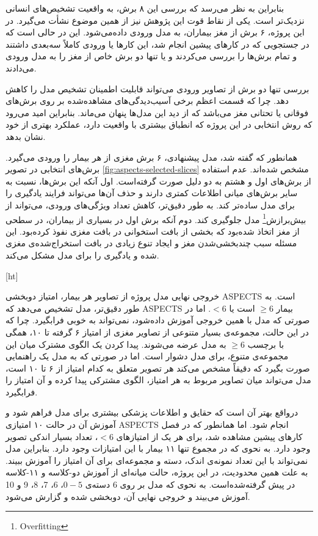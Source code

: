  بنابراین به نظر می‌رسد که بررسی این ۸ برش، به واقعیت تشخیص‌های انسانی نزدیک‌تر است.
 یکی از نقاط قوت این پژوهش نیز از همین موضوع نشأت می‌گیرد.
 در این پروژه، ۶ برش از مغز بیماران، به مدل ورودی داده‌می‌شود.
این در حالی است که در جستجویی که در کارهای پیشین
انجام شد، این کارها یا ورودی کاملاً سه‌بعدی داشتند و تمام برش‌ها را بررسی می‌کردند و یا تنها دو برش خاص از مغز را به مدل ورودی می‌دادند.

بررسی تنها دو برش از تصاویر ورودی می‌تواند قابلیت اطمینان تشخیص مدل را کاهش دهد.
چرا که قسمت اعظم برخی آسیب‌دیدگی‌های مشاهده‌شده
بر روی برش‌های فوقانی یا تحتانی مغز می‌باشد که از دید این مدل‌ها پنهان می‌ماند.
بنابراین امید می‌رود که روش انتخابی در این پروژه که انطباق بیشتری با واقعیت دارد، عملکرد بهتری از خود نشان بدهد.

همانطور که گفته شد، مدل پیشنهادی، ۶ برش مغزی از هر بیمار را ورودی می‌گیرد.
 برش‌های انتخابی در تصویر \ref{fig:aspects-selected-slices} مشخص شده‌اند.
 عدم استفاده از برش‌های اول و هشتم 
به دو دلیل صورت گرفته‌است.
اول آنکه این برش‌ها، نسبت به سایر برش‌های میانی اطلاعات کمتری دارند و حذف آن‌ها می‌تواند فرایند یادگیری را برای مدل ساده‌تر کند.
به طور دقیق‌تر، کاهش تعداد ویژگی‌های ورودی، می‌تواند از 
بیش‌برازش\footnote{Overfitting}
مدل جلوگیری کند.
دوم آنکه برش اول در بسیاری از بیماران، در سطحی از مغز اتخاذ شده‌بود که 
بخشی از بافت استخوانی در بافت مغزی نفوذ کرده‌بود.
این مسئله سبب چند‌بخشی‌شدن مغز و ایجاد تنوع زیادی در بافت استخراج‌شده‌ی مغزی شده و یادگیری را برای مدل مشکل می‌کند.

[ht]


خروجی نهایی مدل پروژه از تصاویر هر بیمار، امتیاز دوبخشی ASPECTS است.
به طور دقیق‌تر، مدل تشخیص می‌دهد که ASPECTS بیمار $\geq 6$ است یا $<6$.
اما در صورتی که مدل با همین خروجی آموزش داده‌شود،
نمی‌تواند به خوبی فرابگیرد.
چرا که در این حالت،
مجموعه‌ی بسیار متنوعی از تصاویر مغزی از
امتیاز ۶ گرفته تا ۱۰، همگی با برچسب
$\geq6$ به مدل عرضه می‌شوند.
پیدا کردن یک الگوی مشترک میان این مجموعه‌ی متنوع، برای مدل دشوار است.
اما در صورتی که به مدل یک راهنمایی صورت بگیرد که دقیقاً مشخص می‌کند هر تصویر متعلق به کدام امتیاز از ۶ تا ۱۰ است، مدل می‌تواند میان تصاویر مربوط به هر امتیاز، الگوی مشترکی پیدا کرده و آن امتیاز را فرابگیرد.

درواقع بهتر آن است که حقایق و اطلاعات پزشکی بیشتری برای مدل فراهم شود و آموزش آن در حالت ۱۰ امتیازی ASPECTS انجام شود.
اما همانطور که در فصل کار‌های پیشین مشاهده شد، برای هر یک از امتیاز‌های $<6$، تعداد بسیار اندکی تصویر وجود دارد.
به نحوی که در مجموع تنها ۱۱ بیمار با این امتیازات وجود دارد.
بنابراین مدل نمی‌تواند با این تعداد نمونه‌ی اندک، دسته و مجموعه‌ای برای آن امتیاز را آموزش ببیند.
به علت همین محدودیت، در این پروژه، حالت میانه‌ای از آموزش دو-کلاسه و ۱۱-کلاسه در پیش گرفته‌شده‌است.
به نحوی که مدل بر روی 6 دسته‌ی $0-5$، 6، 7، 8، 9 و 10 آموزش می‌بیند و خروجی نهایی آن،‌ دوبخشی شده و گزارش می‌شود.

